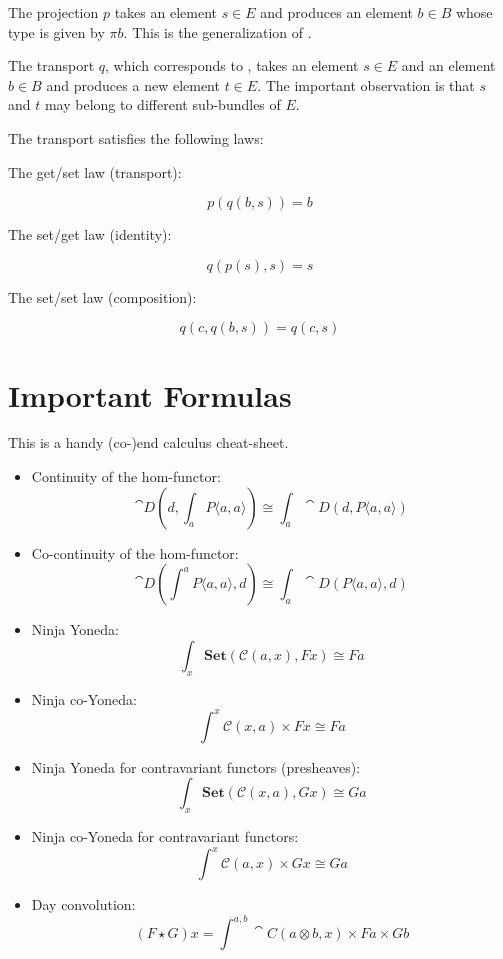 \documentclass[DaoFP]{subfiles}
\begin{document}
The projection $p$ takes an element $s \in E$ and produces an element $b \in B$ whose type is given by $\pi b$. This is the generalization of . 

The transport $q$, which corresponds to , takes an element $s \in E$ and an element $b \in B$ and produces a new element $t \in E$. The important observation is that $s$ and $t$ may belong to different sub-bundles of $E$.


The transport satisfies the following laws:

The get/set law (transport):

\[ p (q (b, s)) = b \]

The set/get law (identity):

\[ q ( p (s), s) = s \]

The set/set law (composition):

\[ q (c, q (b, s)) = q (c, s) \]

\section{Important Formulas}
This is a handy (co-)end calculus cheat-sheet.
\begin{itemize}
\item Continuity of the hom-functor:
\[\cat D\left(d, \int_a P\langle a, a \rangle \right) \cong \int_a \cat D \left(d, P\langle a, a \rangle \right) \]
\item Co-continuity of the hom-functor:
\[\cat D\left( \int^a P\langle a, a \rangle , d \right) \cong \int_a \cat D \left( P\langle a, a \rangle, d \right) \]
\item Ninja Yoneda:
\[ \int_{x} \mathbf{Set} (\mathcal{C}(a, x), F x) \cong F a \]
\item Ninja co-Yoneda:
\[ \int^{x} \mathcal{C}(x, a) \times F x \cong F a \]
\item Ninja Yoneda for contravariant functors (presheaves):
\[ \int_{x} \mathbf{Set} (\mathcal{C}(x, a), G x) \cong G a \]
\item Ninja co-Yoneda for contravariant functors:
\[ \int^{x} \mathcal{C}(a, x) \times G x \cong G a \]
\item Day convolution:
\[ (F \star G) x = \int^{a, b} \cat C (a \otimes b, x) \times F a \times G b \]

\end{itemize}
\end{document}
